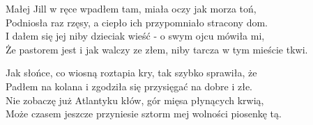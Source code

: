 Małej Jill w ręce wpadłem tam, miała oczy jak morza toń, \\
Podniosła raz rzęsy, a ciepło ich przypomniało stracony dom. \\
I dałem się jej niby dzieciak wieść - o swym ojcu mówiła mi, \\
Że pastorem jest i jak walczy ze złem, niby tarcza w tym mieście tkwi. \\
\newpage

Jak słońce, co wiosną roztapia kry, tak szybko sprawiła, że \\
Padłem na kolana i zgodziła się przysięgać na dobre i złe. \\
Nie zobaczę już Atlantyku kłów, gór mięsa płynących krwią, \\
Może czasem jeszcze przyniesie sztorm mej wolności piosenkę tą. \\
